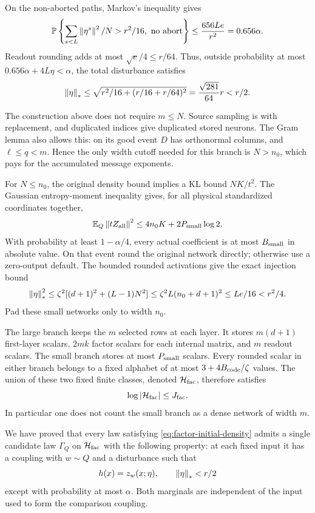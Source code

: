 On the non-aborted paths, Markov's inequality gives
\[
 \mathbb P\left\{\sum_{s<L}\left\|\eta^s\right\|^2/N>r^2/16,
                         \ \text{no abort}\right\}
 \le\frac{656Le}{r^2}=0.656\alpha.
\]
Readout rounding adds at most $\sqrt e/4\le r/64$. Thus, outside probability
at most $0.656\alpha+4L\eta<\alpha$, the total disturbance satisfies
\[
 \left\|\eta\right\|_*\le
 \sqrt{r^2/16+(r/16+r/64)^2}
       =\frac{\sqrt{281}}{64}r<r/2.
\]

The construction above does not require $m\le N$. Source sampling is with
replacement, and duplicated indices give duplicated stored neurons. The
Gram lemma also allows this: on its good event $D$ has orthonormal columns,
and $\ell\le q<m$. Hence the only width cutoff needed for this branch is
$N>n_0$, which pays for the accumulated message exponents.

For $N\le n_0$, the original density bound implies a KL bound
$NK/t^2$. The Gaussian entropy-moment inequality gives, for all physical
standardized coordinates together,
\[
 \mathbb E_Q\left\|tZ_{\rm all}\right\|^2
       \le4n_0K+2P_{\rm small}\log2.
\]
With probability at least $1-\alpha/4$, every actual coefficient is at
most $B_{\rm small}$ in absolute value. On that event round the original
network directly; otherwise use a zero-output default. The bounded rounded
activations give the exact injection bound
\[
 \left\|\eta\right\|_*^2
 \le\zeta^2[(d+1)^2+(L-1)N^2]
 \le\zeta^2L(n_0+d+1)^2\le Le/16<r^2/4.
\]
Pad these small networks only to width $n_0$.

The large branch keeps the $m$ selected rows at each layer. It stores
$m(d+1)$ first-layer scalars, $2mk$ factor scalars for each internal
matrix, and $m$ readout scalars. The small branch stores at most
$P_{\rm small}$ scalars. Every rounded scalar in either branch belongs
to a fixed alphabet of at most $3+4B_{\rm code}/\zeta$ values.
The union of these two fixed finite classes, denoted $\mathcal H_{\rm fac}$,
therefore satisfies
\begin{equation}\label{eq:factor-finite-class}
 \log|\mathcal H_{\rm fac}|\le J_{\rm fac}.
\end{equation}
In particular one does not count the small branch as a dense network of
width $m$.

We have proved that every law satisfying
\eqref{eq:factor-initial-density} admits a single candidate law
$\Gamma_Q$ on $\mathcal H_{\rm fac}$ with the following property: at each
fixed input it has a coupling with $w\sim Q$ and a disturbance such that
\begin{equation}\label{eq:factor-final-coupling}
 h(x)=z_w(x;\eta),\qquad \left\|\eta\right\|_*<r/2
\end{equation}
except with probability at most $\alpha$. Both marginals are independent
of the input used to form the comparison coupling.

